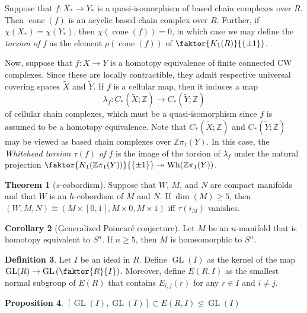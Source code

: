 \documentclass[10pt,letterpaper,cm]{nupset}
\theoremstyle{definition}
\newtheorem{definition}{Definition}[section]
\theoremstyle{theorem}
\newtheorem{theorem}[definition]{Theorem}
\newtheorem{corollary}[definition]{Corollary}
\newtheorem{prop}[definition]{Proposition}
\theoremstyle{remark}
\newcommand{\Z}{\mathbb Z}
\newcommand{\1}{\mathbf{1}}
\newcommand{\0}{\vec 0}
\DeclareMathOperator*{\GL}{GL}
\DeclareMathOperator{\cone}{cone}
\DeclareMathOperator{\wh}{Wh}
\begin{document}
\smallskip

Suppose that $f: X_{\ast} \to Y_{\ast}$ is a quasi-isomorphism of based chain complexes over $R$. Then $\cone(f)$ is an acyclic based chain complex over $R$. Further, if $\chi(X_{\ast}) = \chi(Y_{\ast})$, then $\chi(\cone(f)) =0$, in which case we may  define the \textit{torsion of $f$} as the element $\rho(\cone(f))$ of $\faktor{K_1(R)}{\left\{\pm 1\right\}}$.

Now, suppose that $f: X \to Y$ is a homotopy equivalence of finite connected CW complexes. Since these are locally contractible, they admit respective universal covering spaces $\widetilde{X}$ and $\widetilde{Y}$. If $f$ is a cellular map, then it induces a map
\[
\lambda_f: C_{\ast}(\widetilde{X}; \Z) \to C_{\ast}(\widetilde{Y}; \Z)
\] of cellular chain complexes, which must be a quasi-isomorphism since $f$ is assumed to be a homotopy equivalence. Note that $C_{\ast}(\widetilde{X}; \Z)$ and $C_{\ast}(\widetilde{Y}; \Z)$ may be viewed as based chain complexes over $\Z{\pi_1(Y)}$. In this case, the \textit{Whitehead torsion $\tau(f)$ of $f$} is the image of the torsion of $\lambda_f$ under the natural projection $\faktor{K_1(\Z{\pi_1(Y)})}{\left\{\pm 1\right\}} \twoheadrightarrow \wh(\Z{\pi_1(Y)})$.

\begin{theorem}[$s$-cobordism]
Suppose that $W$, $M$, and $N$ are compact manifolds and that $W$ is an $h$-cobordism of $M$ and $N$. If $\dim(M) \geq 5$, then $\left(W, M, N\right) \cong \left(M \times \left[0, 1\right], M \times 0, M \times 1\right)$ iff $\tau(i_M)$ vanishes.
\end{theorem}

\begin{corollary}[Generalized Poincar\'e conjecture]
Let $M$ be an $n$-manifold that is homotopy equivalent to $S^n$. If $n\geq 5$, then $M$ is homeomorphic to $S^n$.
\end{corollary}

\medskip

\begin{definition}
Let $I$ be an ideal in $R$. Define $\GL(I)$ as the kernel of the map $\GL(R) \to \GL\left(\faktor{R}{I}\right)$. Moreover, define $E(R, I)$ as the smallest normal subgroup of $E(R)$ that contains $E_{i, j}(r)$ for any $r\in I$ and $i\ne j$.
\end{definition}

\begin{prop}
$\left[\GL(I), \GL(I)\right] \subset E(R, I)\unlhd \GL(I)$
\end{prop}
\end{document}
